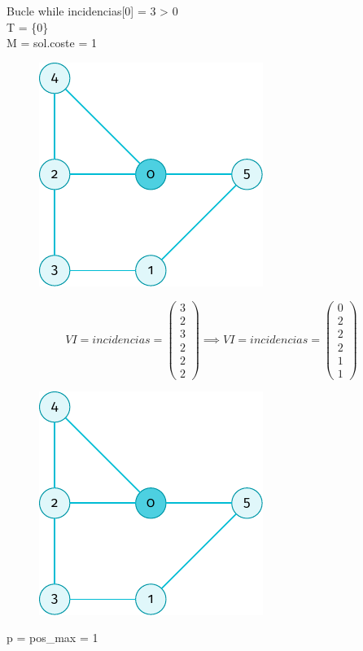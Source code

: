 \documentclass[spanish]{beamer}
\begin{document}
\begin{frame}{Bucle while}
	incidencias[0] = 3 > 0\\
	T = \{0\}\\
	M = sol.coste = 1
	\begin{figure}[H]
		\centering \includegraphics{./img/grafo-ejemplo-1.pdf}
	\end{figure}
\end{frame}

\begin{frame}{}
	$$  VI = incidencias = 
	\begin{pmatrix}
	  3 \\
	  2 \\
	  3 \\
	  2 \\
	  2 \\
	  2
	\end{pmatrix} \implies  VI = incidencias = 
	\begin{pmatrix}	
	  0 \\
	  2 \\
	  2 \\
	  2 \\
	  1 \\
	  1
	\end{pmatrix}$$

	\begin{figure}[H]
		\centering \includegraphics{./img/grafo-ejemplo-1.pdf}
	\end{figure}
	p = pos\_max = 1

\end{frame}
\end{document}

